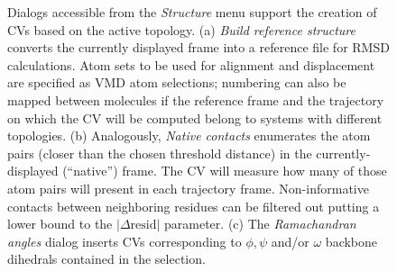 \documentclass[preprint,12pt]{elsarticle}
\begin{document}
\begin{figure}\label{fig:structure}
  \centering
  \caption{Dialogs accessible from the \emph{Structure} menu support
    the creation of CVs based on the active topology. (a) \emph{Build
      reference structure} converts the currently displayed frame into
    a reference file for RMSD calculations.  Atom sets to be used for
    alignment and displacement are specified as VMD atom selections;
    numbering can also be mapped between molecules if the reference
    frame and the trajectory on which the CV will be computed belong
    to systems with different topologies. (b) Analogously,
    \emph{Native contacts} enumerates  the atom pairs (closer
    than the chosen threshold distance) in the currently-displayed
    (``native'') frame. The CV will measure how many of
    those atom pairs will present in each trajectory frame. 
    Non-informative contacts between neighboring residues can be
    filtered out putting a lower bound to the $| \Delta \mbox{resid}
    |$ parameter. (c) The \emph{Ramachandran angles} dialog inserts
    CVs corresponding to $\phi, \psi$ and/or $\omega$ backbone
    dihedrals contained in the selection.}
\end{figure}
\end{document}
